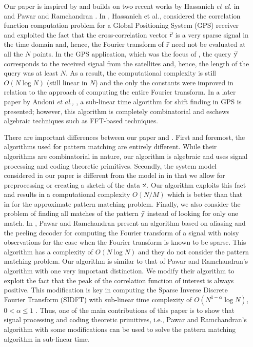 Our paper is inspired by and builds on two recent works by Hassanieh {\em {et al.}} in \cite{hassanieh2012faster} and Pawar and Ramchandran \cite{pawar2014robust}. In \cite{hassanieh2012faster}, Hassanieh et al., considered the correlation function computation problem for a Global Positioning System (GPS) receiver and exploited the fact that the cross-correlation vector $\vec{\mathrm{r}}$ is a very sparse signal in the time domain and, hence, the Fourier transform of $\vec{\mathrm{r}}$ need not be evaluated at all the $N$ points. In the GPS application, which was the focus of \cite{hassanieh2012faster}, the query $\vec{\mathrm{y}}$ corresponds to the received signal from the satellites and, hence, the length of the query was at least $N$. As a result, the computational complexity is still $O(N \log N)$ (still linear in $N$) and the only the constants were improved in relation to the approach of computing the entire Fourier transform. In a later paper by Andoni {\em et al.,} \cite{andoni2013shift}, a sub-linear time algorithm for shift finding in GPS is presented; however, this algorithm is completely combinatorial and eschews algebraic techniques such as FFT-based techniques.

There are important differences between our paper and \cite{hassanieh2012faster,andoni2013shift,boyer1977fast,amir2004faster}. First and foremost, the algorithms used for pattern matching are entirely different. While their algorithms are combinatorial in nature, our algorithm is algebraic and uses signal processing and coding theoretic primitives. Secondly, the system model considered in our paper is different from the model in \cite{hassanieh2012faster,andoni2013shift,boyer1977fast,amir2004faster} in that we allow for preprocessing or creating a sketch of the data $\vec{\mathrm{x}}$. Our algorithm exploits this fact and results in a computational complexity $O(N/M)$ which is better than that in \cite{andoni2013shift} for the approximate pattern matching problem.  Finally, we also consider the problem of finding all matches of the pattern $\vec{\mathrm{y}}$ instead of looking for only one match. In \cite{pawar2014robust}, Pawar and Ramchandran present an algorithm based on aliasing and the peeling decoder for computing the Fourier transform of a signal with noisy observations for the case when the Fourier transform is known to be sparse. This algorithm has a complexity of $O(N \log N)$ and they do not consider the pattern matching problem. Our algorithm is similar to that of Pawar and Ramchandran's algorithm with one very important distinction. We modify their algorithm to exploit the fact that the peak of the correlation function of interest is always positive. This modification is key in computing the Sparse Inverse Discrete Fourier Transform (SIDFT) with sub-linear time complexity of $O(N^{1-\alpha} \log N)$, $0 < \alpha \leq 1$ . Thus, one of the main contributions of this paper is to show that signal processing and coding theoretic primitives, i.e., Pawar and Ramchandran's algorithm with some modifications can be used to solve the pattern matching algorithm in sub-linear time. 